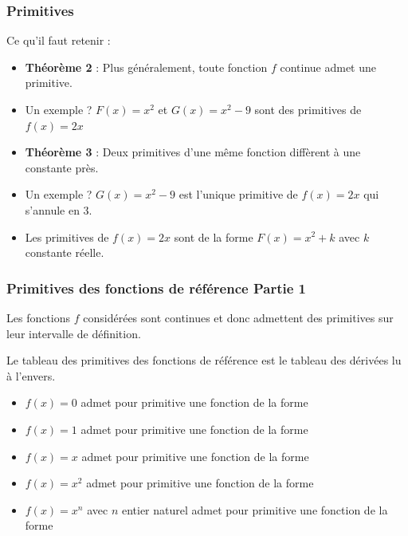 \documentclass[11pt, hyperref={urlcolor=red,%
            linkcolor=blue, %
            colorlinks=true}]{beamer}
\begin{document}
\begin{frame}
\frametitle{Primitives}
\label{primitives}

Ce qu'il faut retenir :

\begin{itemize}


 \item \textbf{Théorème 2} : Plus généralement, toute fonction $f$ continue admet une  primitive.
	\pause  \item Un exemple ?  $F(x)=x^2$  et $G(x)=x^2-9$ sont des primitives de $f(x)=2x$
	\pause \item \textbf{Théorème 3} : Deux primitives d'une même fonction diffèrent à une constante près.
	\pause  \item Un exemple ?  $G(x)=x^2-9$  est l'unique  primitive  de $f(x)=2x$ qui s'annule en $3$.
	\pause \item Les primitives de $f(x)=2x$ sont de la forme $F(x)=x^2+k$ avec $k$ constante réelle.


\end{itemize}

\end{frame}


\begin{frame}
\frametitle{Primitives des fonctions de référence Partie 1}
\label{primitives}

Les fonctions $f$ considérées sont continues et donc admettent des primitives sur leur intervalle de définition.

Le tableau des primitives des fonctions de référence est le tableau des dérivées lu à l'envers.
\begin{itemize}


 \item $f(x)=0$ admet pour primitive une  fonction de la forme 
 \item $f(x)=1$ admet pour primitive une  fonction de la forme 
	 \item $f(x)=x$ admet pour primitive une  fonction de la forme \uncover<3->{$F(x)=\frac{1}{2}x^{2}+k$ avec $k$ constante}
 \item $f(x)=x^{2}$ admet pour primitive une  fonction de la forme 
 \item $f(x)=x^{n}$ avec $n$ entier naturel admet pour primitive une  fonction de la forme 

\end{itemize}

\end{frame}
\end{document}
